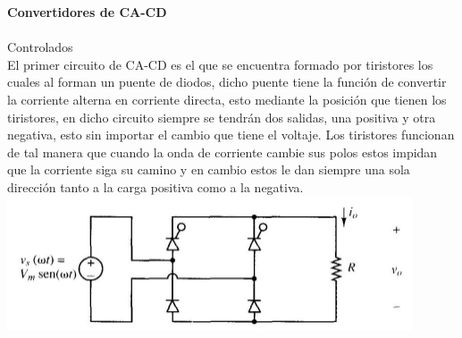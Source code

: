 \documentclass[12pt]{report}
\begin{document}
 {\huge \textbf{Convertidores de CA-CD}\\}\\
 {\Large Controlados}\\
 
El primer circuito de CA-CD es el que se encuentra formado por tiristores los cuales al forman un puente de diodos, dicho puente tiene la función de convertir la corriente alterna en corriente directa, esto mediante la posición que tienen los tiristores, en dicho circuito siempre se tendrán dos salidas, una positiva y otra negativa, esto sin importar el cambio que tiene el voltaje. Los tiristores funcionan de tal manera que cuando la onda de corriente cambie sus polos estos impidan que la corriente siga su camino y en cambio estos le dan siempre una sola dirección tanto a la carga positiva como a la negativa.\\
\includegraphics[width=12cm]{tiristor.jpg} 
 
 
 
\end{document}
